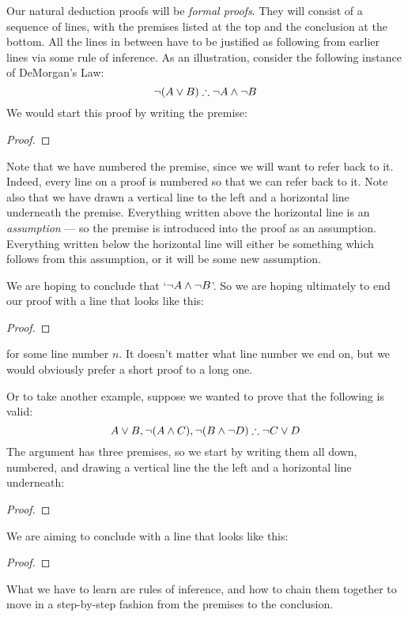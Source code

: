 Our natural deduction proofs will be \emph{formal proofs}.  They will consist of a sequence of lines, with the premises  listed at the top and the conclusion at the bottom.  All the lines in between have to be justified as following from earlier lines via some rule of inference. As an illustration, consider the following instance of DeMorgan's Law:
	$$\neg (A \vee B) \therefore \neg A \wedge \neg B$$
We would start this proof by writing the premise:
\begin{proof}
	 
\end{proof}
Note that we have numbered the premise, since we will want to refer back to it. Indeed, every line on a proof is numbered so that we can refer back to it.  Note also that we have drawn a vertical line to the left and a horizontal line underneath the premise. Everything written above the horizontal line is an \emph{assumption} --- so the premise is introduced into the proof as an assumption. Everything written below the horizontal line will either be something which follows from this assumption, or it will be some new assumption.

We are hoping to conclude that `$\neg A \wedge \neg B$'.  So we are hoping ultimately to end our proof with a line that looks like this:
\begin{proof}
\end{proof}
for some line number $n$. It doesn't matter what line number we end on, but we would obviously prefer a short proof to a long one.

Or to take another example, suppose we wanted to prove that the following is valid:
$$A\vee B, \neg (A\wedge C), \neg (B \wedge \neg D) \therefore \neg C\vee D$$
The argument has three premises, so we start by writing them all down, numbered, and drawing a vertical line the the left and a horizontal line underneath:
\begin{proof}
	  
	 
	 
\end{proof}
We are aiming to conclude with a line that looks like this:
\begin{proof}
\end{proof}
What we have to learn are rules of inference, and how to chain them together to move in a step-by-step fashion from the premises to the conclusion.

